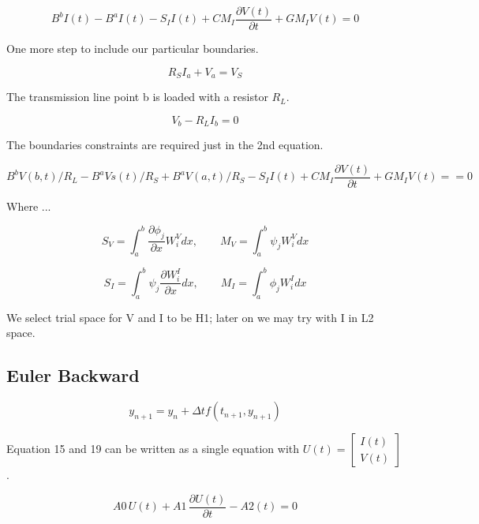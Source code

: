 \documentclass[12pt, letterpaper]{article}
\begin{document}
\begin{equation}
	B^b I(t) - B^a I(t)
	- S_I I(t) + C M_I \frac{\partial V(t)}{\partial t} + G M_I V(t) 
	= 0
\end{equation}

One more step to include our particular boundaries.


\begin{equation}
	R_S I_a + V_a = V_S
\end{equation}

The transmission line point b is loaded with a resistor $R_L$.

\begin{equation}
	V_b - R_L I_b = 0
\end{equation}

The boundaries constraints are required just in the 2nd equation.

\begin{equation}
	B^b V(b,t) /R_L - B^a Vs(t) / R_S +  B^a V(a,t) / R_S
	- S_I I(t) + C M_I \frac{\partial V(t)}{\partial t} + G M_I V(t) = 
	= 0
\end{equation}




Where ...

\[S_V = \int_a^b  \frac{\partial \phi_j}{\partial x} W^V_i dx,
\qquad
M_V = \int_a^b \psi_j W^V_i dx\]

\[S_I = \int_a^b \psi_j \frac{\partial W^I_i}{\partial x} dx,
\qquad
M_I = \int_a^b \phi_j W^I_i dx\]

We select trial space for V and I to be H1; later on we may try with I in L2 space.\\

\subsection{Euler Backward}

\begin{equation}
y_{n+1} = y_{n} + \Delta t f(t_{n+1}, y_{n+1})
\end{equation}

Equation 15 and 19 can be written as a single equation with $U(t) = 	\begin{bmatrix}
	I(t) \\
	V(t)
\end{bmatrix} $.

\begin{equation}
	A0\, U(t) + A1\, \frac{\partial U(t)}{\partial t} - A2(t) = 0
\end{equation}
\end{document}
